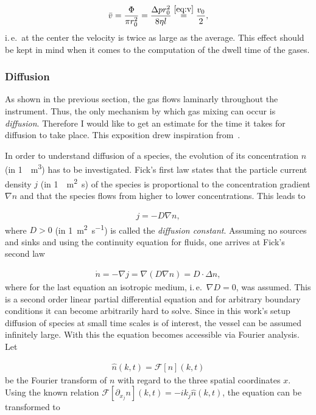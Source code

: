 \begin{align*}
  \bar v = \frac{\Phi}{\pi r_0^2} = \frac{\Delta p r_0^2}{8\eta l} \stackrel{\eqref{eq:v}}{=} \frac{v_0}{2},
\end{align*}
i.\,e.\ at the center the velocity is twice as large as the
average. This effect should be kept in mind when it comes to the
computation of the dwell time of the gases.

\subsubsection{Diffusion}
\label{sec:diffusion}

As shown in the previous section, the gas flows laminarly throughout
the instrument. Thus, the only mechanism by which gas mixing can occur
is \emph{diffusion}. Therefore I would like to get an estimate for the
time it takes for diffusion to take place. This exposition drew
inspiration from~\cite{fluid}.

In order to understand diffusion of a species, the evolution of its
concentration $n$ (in \SI{1}{\per\cubic\meter}) has to be
investigated. Fick's first law states that the particle current
density $j$ (in \SI{1}{\per\square\meter\second}) of the species is
proportional to the concentration gradient $\nabla n$ and that the
species flows from higher to lower concentrations. This leads to

\begin{align*}
  j = - D \nabla n,
\end{align*}
where $D > 0$ (in \SI{1}{\square\meter\per\second}) is called the
\emph{diffusion constant}. Assuming no sources and sinks and using the
continuity equation for fluids, one arrives at Fick's second law

\begin{align*}
  \dot n = - \nabla j = \nabla (D \nabla n) = D \cdot \Delta n,
\end{align*}
where for the last equation an isotropic medium, i.\,e.\
$\nabla D = 0$, was assumed. This is a second order linear partial
differential equation and for arbitrary boundary conditions it can
become arbitrarily hard to solve. Since in this work's setup diffusion
of species at small time scales is of interest, the vessel can be
assumed infinitely large. With this the equation becomes accessible
via Fourier analysis. Let

\begin{align*}
  \hat n(k,t) = \mathcal{F}[n](k,t)
\end{align*}
be the Fourier transform of $n$ with regard to the three spatial
coordinates $x$. Using the known relation $\mathcal{F}[\partial_{x_j}
n](k,t) = -ik_j \hat n(k,t)$, the equation can be transformed to

